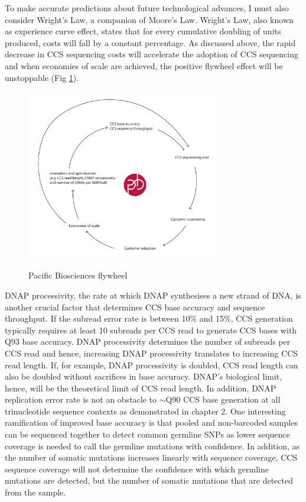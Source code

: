 To make accurate predictions about future technological advances, I must also consider Wright’s Law, a companion of Moore’s Law. Wright’s Law, also known as experience curve effect, states that for every cumulative doubling of units produced, costs will fall by a constant percentage. As discussed above, the rapid decrease in CCS sequencing costs will accelerate the adoption of CCS sequencing and when economies of scale are achieved, the positive flywheel effect will be unstoppable (Fig \ref{figure:flywheel}). 

\begin{figure}[h!]
\caption{Pacific Biosciences flywheel}
\label{figure:flywheel}
\begin{centering}
\includegraphics[width=0.75\textwidth]{pacbio_flywheel.pdf} \\ \smallskip
\end{centering}
\end{figure}

DNAP processivity, the rate at which DNAP synthesises a new strand of DNA, is another crucial factor that determines CCS base accuracy and sequence throughput. If the subread error rate is between 10\% and 15\%, CCS generation typically requires at least 10 subreads per CCS read to generate CCS bases with Q93 base accuracy. DNAP processivity determines the number of subreads per CCS read and hence, increasing DNAP processivity translates to increasing CCS read length. If, for example, DNAP processivity is doubled, CCS read length can also be doubled without sacrifices in base accuracy. DNAP’s biological limit, hence, will be the theoretical limit of CCS read length. In addition, DNAP replication error rate is not an obstacle to $\sim$Q90 CCS base generation at all trinucleotide sequence contexts as demonstrated in chapter 2. One interesting ramification of improved base accuracy is that pooled and non-barcoded samples can be sequenced together to detect common germline SNPs as lower sequence coverage is needed to call the germline mutations with confidence. In addition, as the number of somatic mutations increases linearly with sequence coverage, CCS sequence coverage will not determine the confidence with which germline mutations are detected, but the number of somatic mutations that are detected from the sample. 

